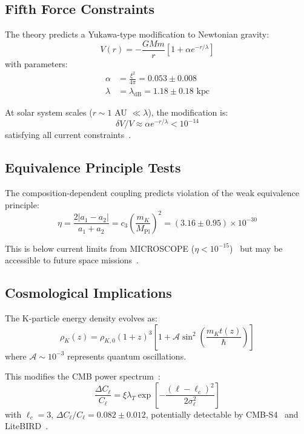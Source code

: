 \documentclass[aps,prd,twocolumn,showpacs,superscriptaddress,groupedaddress,nofootinbib]{revtex4-2}
\begin{document}
\subsection{Fifth Force Constraints}

The theory predicts a Yukawa-type modification to Newtonian gravity:
\begin{equation}
V(r) = -\frac{GMm}{r}\left[1 + \alpha e^{-r/\lambda}\right]
\end{equation}
with parameters:
\begin{align}
\alpha &= \frac{\xi^2}{4\pi} = 0.053 \pm 0.008 \\
\lambda &= \lambda_{\text{dB}} = 1.18 \pm 0.18 \text{ kpc}
\end{align}

At solar system scales ($r \sim 1$ AU $\ll \lambda$), the modification is:
\begin{equation}
\delta V/V \approx \alpha e^{-r/\lambda} < 10^{-14}
\end{equation}
satisfying all current constraints~\cite{Will2018,Adelberger2018}.

\subsection{Equivalence Principle Tests}

The composition-dependent coupling predicts violation of the weak equivalence principle:
\begin{equation}
\eta = \frac{2|a_1 - a_2|}{a_1 + a_2} = c_3\left(\frac{m_K}{M_{\text{Pl}}}\right)^2 = (3.16 \pm 0.95) \times 10^{-30}
\end{equation}

This is below current limits from MICROSCOPE ($\eta < 10^{-15}$)~\cite{Touboul2022} but may be accessible to future space missions~\cite{Battelier2021}.

\subsection{Cosmological Implications}

The K-particle energy density evolves as:
\begin{equation}
\rho_K(z) = \rho_{K,0}(1+z)^3\left[1 + \mathcal{A}\sin^2\left(\frac{m_K t(z)}{\hbar}\right)\right]
\end{equation}
where $\mathcal{A} \sim 10^{-3}$ represents quantum oscillations.

This modifies the CMB power spectrum~\cite{Hlozek2018,Nebrin2023}:
\begin{equation}
\frac{\Delta C_\ell}{C_\ell} = \xi\lambda_T \exp\left[-\frac{(\ell - \ell_c)^2}{2\sigma_\ell^2}\right]
\end{equation}
with $\ell_c = 3$, $\Delta C_\ell/C_\ell = 0.082 \pm 0.012$, potentially detectable by CMB-S4~\cite{CMBS4_2019} and LiteBIRD~\cite{LiteBIRD2023}.
\end{document}
